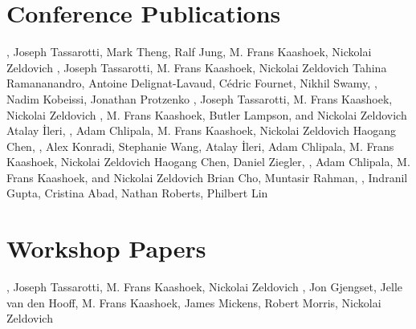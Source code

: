 \documentclass[11pt,a4paper,roman]{moderncv}   %
\begin{document}
\section{Conference Publications}
%
{\selfauthor, Joseph Tassarotti, Mark Theng, Ralf Jung, M. Frans Kaashoek, Nickolai Zeldovich}
%
{\selfauthor, Joseph Tassarotti, M. Frans Kaashoek, Nickolai Zeldovich}
%
{Tahina Ramananandro, Antoine Delignat-Lavaud, Cédric Fournet, Nikhil
Swamy, \selfauthor, Nadim Kobeissi, Jonathan Protzenko}
%
{\selfauthor, Joseph Tassarotti, M. Frans Kaashoek, Nickolai Zeldovich}
{\selfauthor, M. Frans Kaashoek, Butler Lampson, and Nickolai Zeldovich}
%
{Atalay \.{I}leri, \selfauthor, Adam Chlipala, M. Frans Kaashoek, Nickolai Zeldovich}
%
{Haogang Chen, \selfauthor, Alex Konradi, Stephanie Wang, Atalay \.{I}leri, Adam Chlipala, M. Frans Kaashoek, Nickolai Zeldovich}
%
{Haogang Chen, Daniel Ziegler, \selfauthor, Adam Chlipala, M. Frans Kaashoek, and Nickolai Zeldovich}
%
{Brian Cho, Muntasir Rahman, \selfauthor, Indranil Gupta, Cristina Abad, Nathan Roberts, Philbert Lin}

\section{Workshop Papers}
%
{\selfauthor}
%
{\selfauthor, Joseph Tassarotti, M. Frans Kaashoek, Nickolai Zeldovich}
%
{\selfauthor, Jon Gjengset, Jelle van den Hooff, M. Frans Kaashoek, James Mickens, Robert Morris, Nickolai Zeldovich}

\end{document}
